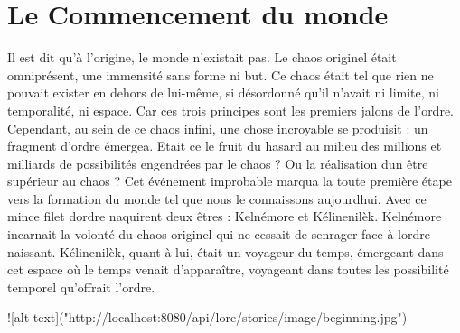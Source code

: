 \chapter{Le Commencement du monde}
\hypertarget{md__2home_2solype_2delivery_2current__days_2Mannheim_2back_2server_2public_2lore_2the__beginning}{}\label{md__2home_2solype_2delivery_2current__days_2Mannheim_2back_2server_2public_2lore_2the__beginning}
\label{md__2home_2solype_2delivery_2current__days_2Mannheim_2back_2server_2public_2lore_2the__beginning_autotoc_md1}%
%
 Il est dit qu’à l’origine, le monde n’existait pas. Le chaos originel était omniprésent, une immensité sans forme ni but. Ce chaos était tel que rien ne pouvait exister en dehors de lui-\/même, si désordonné qu’il n’avait ni limite, ni temporalité, ni espace. Car ces trois principes sont les premiers jalons de l’ordre. Cependant, au sein de ce chaos infini, une chose incroyable se produisit \+: un fragment d’ordre émergea. Etait ce le fruit du hasard au milieu des millions et milliards de possibilités engendrées par le chaos ? Ou la réalisation d\textquotesingle{}un être supérieur au chaos ? Cet événement improbable marqua la toute première étape vers la formation du monde tel que nous le connaissons aujourd\textquotesingle{}hui. Avec ce mince filet d\textquotesingle{}ordre naquirent deux êtres \+: Kelnémore et Kélinenilèk. Kelnémore incarnait la volonté du chaos originel qui ne cessait de s\textquotesingle{}enrager face à l\textquotesingle{}ordre naissant. Kélinenilèk, quant à lui, était un voyageur du temps, émergeant dans cet espace où le temps venait d’apparaître, voyageant dans toutes les possibilité temporel qu’offrait l’ordre.

!\mbox{[}alt text\mbox{]}("{}http\+://localhost\+:8080/api/lore/stories/image/beginning.\+jpg"{}) 